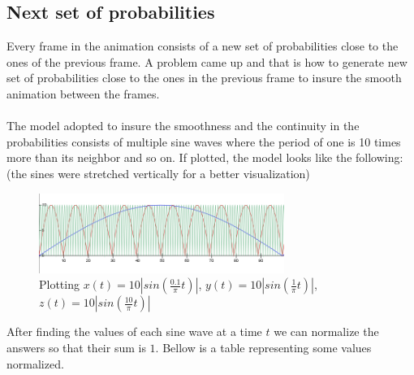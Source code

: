 \documentclass[a4paper, 10pt]{article}
\begin{document}
        \subsection{Next set of probabilities}
        \label{sec:nextproba}
        Every frame in the animation consists of a new set of probabilities close to the ones of the
        previous frame. A problem came up and that is how to generate new set of probabilities close
        to the ones in the previous frame to insure the smooth animation between the frames.\\\\
        The model adopted to insure the smoothness and the continuity in the probabilities consists
        of multiple sine waves where the period of one is 10 times more than its neighbor and so on.
        If plotted, the model looks like the following: (the sines were stretched vertically for a better
        visualization)
        \begin{figure}[hb]
            \centering
                \includegraphics[width=8cm]{graphics/sine_probabilities.png}
            \caption{Plotting
               $x(t) = 10\left| sin \left( \frac{0.1}{\pi}t \right) \right|$, 
               $y(t) = 10\left| sin \left( \frac{1}{\pi}t \right) \right|$, 
               $z(t) = 10\left| sin \left( \frac{10}{\pi}t \right) \right|$}
        \end{figure}
        After finding the values of each sine wave at a time $t$ we can normalize the answers so that
        their sum is $1$. Bellow is a table representing some values normalized.
\end{document}
